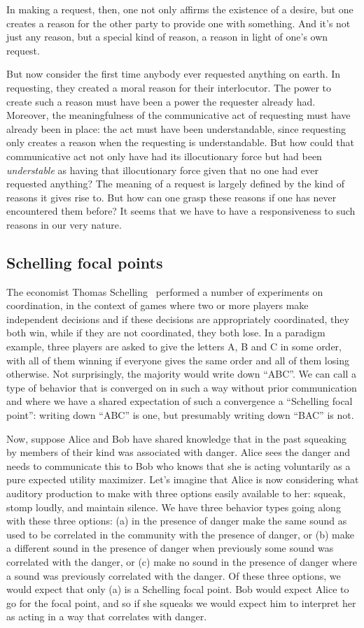 In making a request, then, one not only affirms the existence of a desire, but one creates a reason for the other 
party to provide one with something. And it's not just any reason, but a special kind of reason, a reason in light of one's own request.

But now consider the first time anybody ever requested anything on earth. In requesting, they created a moral reason for their interlocutor. 
The power to create such a reason must have been a power the requester already had.  Moreover, the meaningfulness of 
the communicative act of requesting must have already been in place: the act must have been understandable, 
since requesting only creates a reason when the requesting is understandable. But how could that communicative act not only have had its illocutionary force but had been \textit{understable} as having that illocutionary 
force given that no one had ever requested anything? The meaning of a request is largely defined by the kind of reasons it gives
rise to. But how can one grasp these reasons if one has never encountered them before? It seems that we have to have
a responsiveness to such reasons in our very nature.

\subsection{Schelling focal points}
The economist Thomas Schelling~\parencite{Schelling} performed a number of experiments on coordination, in the context of 
games where two or more players make independent decisions and if these decisions are appropriately coordinated,
they both win, while if they are not coordinated, they both lose. In a paradigm example, three players are asked to
give the letters A, B and C in some order, with all of them winning if everyone gives the same order and all
of them losing otherwise. Not surprisingly, the majority would write down ``ABC''. We can call a type of behavior
that is converged on in such a way without prior communication and where we have a shared expectation of such a 
convergence a ``Schelling focal point'': writing down ``ABC'' is one, but presumably writing down ``BAC'' is not.

Now, suppose Alice and Bob have shared knowledge that in the  past squeaking by members of their kind was associated 
with danger. Alice sees the danger and needs to communicate this to Bob 
who knows that she is acting voluntarily as a pure expected utility maximizer. Let's imagine that Alice is now 
considering what auditory production
to make with three options easily available to her: squeak, stomp loudly, and maintain silence. We have
three behavior types going along with these three options: (a) in the presence of danger make the same sound as
used to be correlated in the community with the presence of danger, or (b) make a different sound in the presence
of danger when previously some sound was correlated with the danger, or (c) make no sound in the presence of 
danger where a sound was previously correlated with the danger. Of these three options, we would expect that only
(a) is a Schelling focal point. Bob would expect Alice to go for the focal point, and so if she squeaks we would
expect him to interpret her as acting in a way that correlates with danger.

